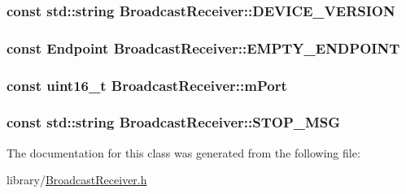 \hypertarget{class_broadcast_receiver_ae22c7443414e66b3e50911e91f6d6e35}{
\subsubsection[{D\-E\-V\-I\-C\-E\-\_\-\-V\-E\-R\-S\-I\-O\-N}]{\setlength{\rightskip}{0pt plus 5cm}const std\-::string Broadcast\-Receiver\-::\-D\-E\-V\-I\-C\-E\-\_\-\-V\-E\-R\-S\-I\-O\-N\hspace{0.3cm}{\ttfamily [static]}}}\label{class_broadcast_receiver_ae22c7443414e66b3e50911e91f6d6e35}
\hypertarget{class_broadcast_receiver_a545fbd086416bfa77cd42b531d045a5b}{
\subsubsection[{E\-M\-P\-T\-Y\-\_\-\-E\-N\-D\-P\-O\-I\-N\-T}]{\setlength{\rightskip}{0pt plus 5cm}const {\bf Endpoint} Broadcast\-Receiver\-::\-E\-M\-P\-T\-Y\-\_\-\-E\-N\-D\-P\-O\-I\-N\-T\hspace{0.3cm}{\ttfamily [static]}}}\label{class_broadcast_receiver_a545fbd086416bfa77cd42b531d045a5b}
\hypertarget{class_broadcast_receiver_a3e1de2825034cb6e2b15641c490d9381}{
\subsubsection[{m\-Port}]{\setlength{\rightskip}{0pt plus 5cm}const uint16\-\_\-t Broadcast\-Receiver\-::m\-Port}}\label{class_broadcast_receiver_a3e1de2825034cb6e2b15641c490d9381}
\hypertarget{class_broadcast_receiver_a6c365a7403457725e25c3124868fd6d9}{
\subsubsection[{S\-T\-O\-P\-\_\-\-M\-S\-G}]{\setlength{\rightskip}{0pt plus 5cm}const std\-::string Broadcast\-Receiver\-::\-S\-T\-O\-P\-\_\-\-M\-S\-G\hspace{0.3cm}{\ttfamily [static]}}}\label{class_broadcast_receiver_a6c365a7403457725e25c3124868fd6d9}


The documentation for this class was generated from the following file\-:\begin{DoxyCompactItemize}
\item 
library/\hyperlink{_broadcast_receiver_8h}{Broadcast\-Receiver.\-h}\end{DoxyCompactItemize}
